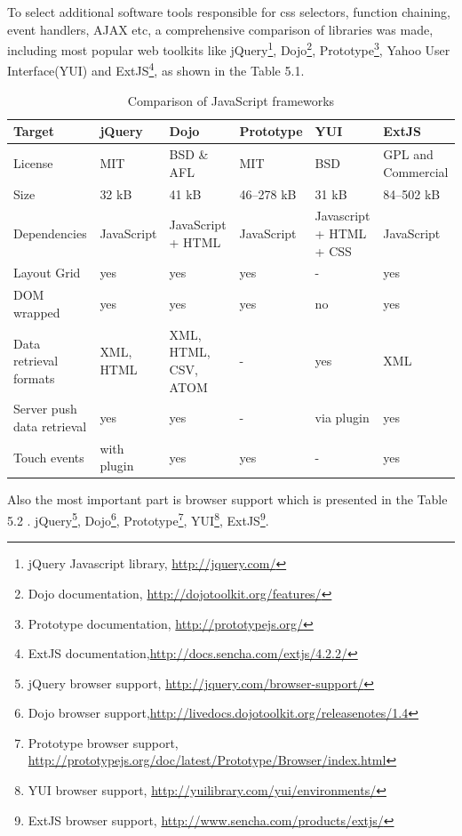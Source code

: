 To select additional software tools responsible for css selectors, function chaining, event handlers, AJAX etc, a comprehensive comparison of libraries was made, including most popular web toolkits like jQuery\footnote{jQuery Javascript library, \url{http://jquery.com/}}, Dojo\footnote{Dojo documentation, \url{http://dojotoolkit.org/features/}}, Prototype\footnote{Prototype documentation, \url{http://prototypejs.org/}}, Yahoo User Interface(YUI) and ExtJS\footnote{ExtJS documentation,\url{http://docs.sencha.com/extjs/4.2.2/}}, as shown in the Table 5.1. 
\begin{table}[H]
\centering
\begin{tabular}{|L{3cm}|l|L{2cm}|l|L{2cm}|L{2cm}|}
\hline
Target 			& jQuery & Dojo & Prototype & YUI & ExtJS \\
\hline
\hline
License		& MIT & BSD \& AFL & MIT & BSD & GPL and Commercial \\
\hline
Size		& 32 kB & 41 kB & 46–278 kB & 31 kB & 84–502 kB \\
\hline
Dependencies		& JavaScript & JavaScript + HTML & JavaScript &  Javascript + HTML + CSS & JavaScript \\
\hline
Layout Grid		& yes & yes & yes & - & yes  \\
\hline
DOM wrapped		& yes & yes & yes & no & yes \\
\hline
Data retrieval formats		& XML, HTML & XML, HTML, CSV, ATOM & - & yes & XML  \\
\hline
Server push data retrieval		& yes & yes & - & via plugin & yes \\
\hline 		
Touch events		& with plugin & yes & yes & - & yes \\
\hline 
\end{tabular}
\caption[Comparison of JavaScript frameworks]{Comparison of JavaScript frameworks}
\label{tab:JS_frameworks}
\end{table}
Also the most important part is browser support which is presented in the Table 5.2 . jQuery\footnote{jQuery browser support, \url{http://jquery.com/browser-support/}}, Dojo\footnote{Dojo browser support,\url{http://livedocs.dojotoolkit.org/releasenotes/1.4}}, Prototype\footnote{Prototype browser support, \url{http://prototypejs.org/doc/latest/Prototype/Browser/index.html}}, YUI\footnote{YUI browser support, \url{http://yuilibrary.com/yui/environments/}}, ExtJS\footnote{ExtJS browser support, \url{http://www.sencha.com/products/extjs/}}.

